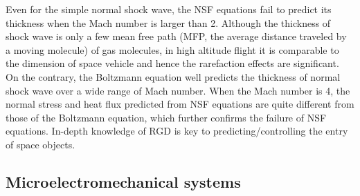 Even for the simple normal shock wave, the NSF equations fail to predict its thickness when the Mach number is larger than 2. Although the thickness of shock wave is only a few mean free path (MFP, the average distance traveled by a moving molecule) of gas molecules, in high altitude flight it is comparable to the dimension of space vehicle and hence the rarefaction effects are significant. On the contrary, the Boltzmann equation well predicts the thickness of normal shock wave over a wide range of Mach number. When the Mach number is 4, the normal stress and heat flux predicted from NSF equations are quite different from those of the Boltzmann equation, which further confirms the failure of NSF equations. In-depth knowledge of RGD is key to predicting/controlling the entry of space objects.



\subsection{Microelectromechanical systems}

